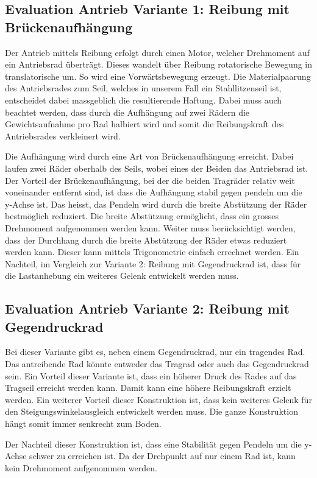 \documentclass[a4paper]{report}
\begin{document}
\subsection{Evaluation Antrieb Variante 1: Reibung mit Brückenaufhängung}
\label{app:ssec:EvalAntrieb1}
Der Antrieb mittels Reibung erfolgt durch einen Motor, welcher Drehmoment auf ein Antriebsrad überträgt. Dieses wandelt über Reibung rotatorische Bewegung in translatorische um. So wird eine Vorwärtsbewegung erzeugt. Die Materialpaarung des Antriebsrades zum Seil, welches in unserem Fall ein Stahllitzenseil ist, entscheidet dabei massgeblich die resultierende Haftung. Dabei muss auch beachtet werden, dass durch die Aufhängung auf zwei Rädern die Gewichtsaufnahme pro Rad halbiert wird und somit die Reibungskraft des Antriebsrades verkleinert wird.

Die Aufhängung wird durch eine Art von Brückenaufhängung erreicht. Dabei laufen zwei Räder oberhalb des Seils, wobei eines der Beiden das Antriebsrad ist. Der Vorteil der Brückenaufhängung, bei der die beiden Tragräder relativ weit voneinander entfernt sind, ist dass die Aufhängung stabil gegen pendeln um die y-Achse ist. Das heisst, das Pendeln wird durch die breite Abstützung der Räder bestmöglich reduziert. Die breite Abstützung ermöglicht, dass ein grosses Drehmoment aufgenommen werden kann. Weiter muss berücksichtigt werden, dass der Durchhang durch die breite Abstützung der Räder etwas reduziert werden kann. Dieser kann mittels Trigonometrie einfach errechnet werden. Ein Nachteil, im Vergleich zur Variante 2: Reibung mit Gegendruckrad ist, dass für die Lastanhebung ein weiteres Gelenk entwickelt werden muss.

\subsection{Evaluation Antrieb Variante 2: Reibung mit Gegendruckrad}
\label{app:ssec:EvalAntrieb2}
Bei dieser Variante gibt es, neben einem Gegendruckrad, nur ein tragendes Rad. Das antreibende Rad könnte entweder das Tragrad oder auch das Gegendruckrad sein. Ein Vorteil dieser Variante ist, dass ein höherer Druck des Rades auf das Tragseil erreicht werden kann. Damit kann eine höhere Reibungskraft erzielt werden. Ein weiterer Vorteil dieser Konstruktion ist, dass kein weiteres Gelenk für den Steigungswinkelausgleich entwickelt werden muss. Die ganze Konstruktion hängt somit immer senkrecht zum Boden.

Der Nachteil dieser Konstruktion ist, dass eine Stabilität gegen Pendeln um die y-Achse schwer zu erreichen ist. Da der Drehpunkt auf nur einem Rad ist, kann kein Drehmoment aufgenommen werden.
\end{document}
